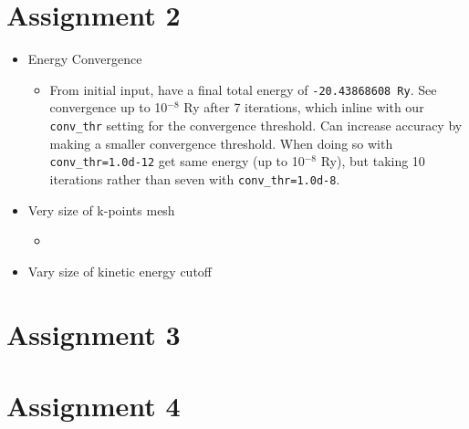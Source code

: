 \documentclass[10pt,a4paper]{labreport}
\begin{document}
\section*{Assignment 2}
\begin{itemize}
  \item Energy Convergence
  \begin{itemize}
    \item From initial input, have a final total energy of \texttt{-20.43868608 Ry}. See convergence up to 10$^{-8}$ Ry after 7 iterations, which inline with our \texttt{conv\_thr} setting for the convergence threshold. Can increase accuracy by making a smaller convergence threshold. When doing so with \texttt{conv\_thr=1.0d-12} get same energy (up to 10$^{-8}$ Ry), but taking 10 iterations rather than seven with  \texttt{conv\_thr=1.0d-8}.
  \end{itemize}
  \item Very size of k-points mesh
  \begin{itemize}
    \item 
  \end{itemize}
  \item Vary size of kinetic energy cutoff
\end{itemize}




\section*{Assignment 3}

\section*{Assignment 4}



\newpage

%   
\end{document}
